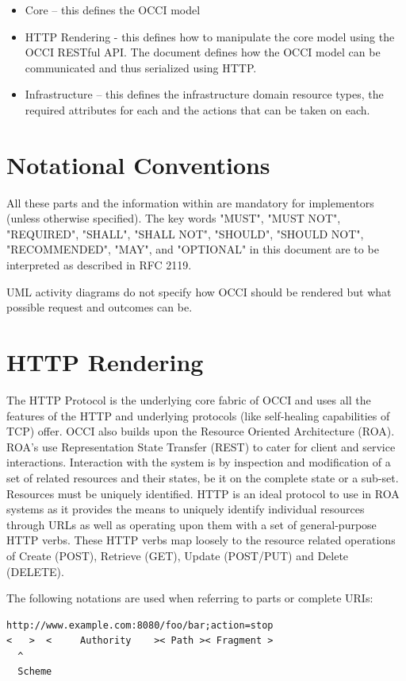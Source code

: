 \documentclass[10pt,a4paper]{article}
\begin{document}
\begin{itemize}
\item Core – this defines the OCCI model
\item HTTP Rendering - this defines how to manipulate the core model using the OCCI RESTful API. The document defines how the OCCI model can be communicated and thus serialized using HTTP.
\item Infrastructure – this defines the infrastructure domain resource types, the required attributes for each and the actions that can be taken on each.
\end{itemize}

\section{Notational Conventions}

All these parts and the information within are mandatory for implementors (unless otherwise specified). The key words "MUST", "MUST NOT", "REQUIRED", "SHALL", "SHALL NOT", "SHOULD", "SHOULD NOT", "RECOMMENDED", "MAY", and "OPTIONAL" in this document are to be interpreted as described in RFC 2119. 

UML activity diagrams do not specify how OCCI should be rendered but what possible request and outcomes can be.

\section{HTTP Rendering}
The HTTP Protocol is the underlying core fabric of OCCI and uses all the features of the HTTP and underlying protocols (like self-healing capabilities of TCP) offer. OCCI also builds upon the Resource Oriented Architecture (ROA). ROA's use Representation State Transfer (REST) to cater for client and service interactions. Interaction with the system is by inspection and modification of a set of related resources and their states, be it on the complete state or a sub-set. Resources must be uniquely identified. HTTP is an ideal protocol to use in ROA systems as it provides the means to uniquely identify individual resources through URLs as well as operating upon them with a set of general-purpose HTTP verbs. These HTTP verbs map loosely to the resource related operations of Create (POST), Retrieve (GET), Update (POST/PUT) and Delete (DELETE).

The following notations are used when referring to parts or complete URIs:

\begin{verbatim}
http://www.example.com:8080/foo/bar;action=stop
<   >  <     Authority    >< Path >< Fragment >
  ^
  Scheme
\end{verbatim}
\end{document}
